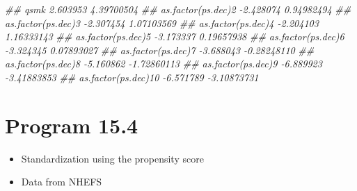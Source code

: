 \documentclass[
  10pt,
  a4paper,
]{book}
\newenvironment{Shaded}{\begin{snugshade}}{\end{snugshade}}
\newcommand{\DocumentationTok}[1]{\textcolor[rgb]{0.37,0.37,0.37}{\textit{#1}}}
\providecommand{\tightlist}{%
  \setlength{\itemsep}{0pt}\setlength{\parskip}{0pt}}
\begin{document}
\begin{Shaded}
\begin{Highlighting}[]
\DocumentationTok{\#\# qsmk                 2.603953  4.39700504}
\DocumentationTok{\#\# as.factor(ps.dec)2  {-}2.428074  0.94982494}
\DocumentationTok{\#\# as.factor(ps.dec)3  {-}2.307454  1.07103569}
\DocumentationTok{\#\# as.factor(ps.dec)4  {-}2.204103  1.16333143}
\DocumentationTok{\#\# as.factor(ps.dec)5  {-}3.173337  0.19657938}
\DocumentationTok{\#\# as.factor(ps.dec)6  {-}3.324345  0.07893027}
\DocumentationTok{\#\# as.factor(ps.dec)7  {-}3.688043 {-}0.28248110}
\DocumentationTok{\#\# as.factor(ps.dec)8  {-}5.160862 {-}1.72860113}
\DocumentationTok{\#\# as.factor(ps.dec)9  {-}6.889923 {-}3.41883853}
\DocumentationTok{\#\# as.factor(ps.dec)10 {-}6.571789 {-}3.10873731}
\end{Highlighting}
\end{Shaded}

\section{Program 15.4}\label{program-15.4}

\begin{itemize}
\tightlist
\item
  Standardization using the propensity score
\item
  Data from NHEFS
\end{itemize}
\end{document}
